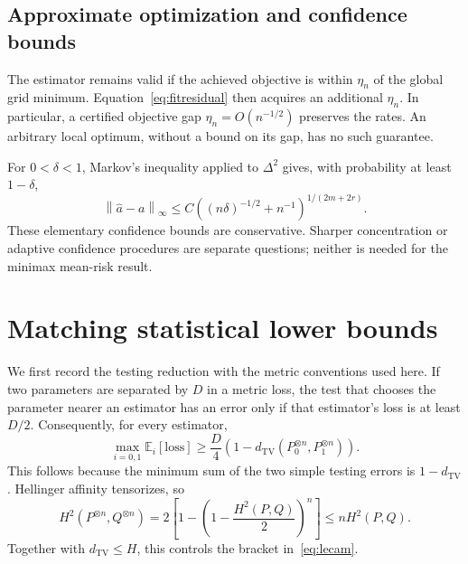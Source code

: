 \documentclass[11pt,a4paper]{article}
\numberwithin{equation}{section}
\theoremstyle{definition}
\theoremstyle{remark}
\newcommand{\E}{\mathbb E}
\newcommand{\TV}{d_{\mathrm{TV}}}
\newcommand{\norm}[1]{\left\lVert#1\right\rVert}
\begin{document}
\subsection{Approximate optimization and confidence bounds}
The estimator remains valid if the achieved objective is within $\eta_n$ of
the global grid minimum. Equation~\eqref{eq:fitresidual} then acquires an
additional $\eta_n$. In particular, a certified objective gap
$\eta_n=O(n^{-1/2})$ preserves the rates. An arbitrary local optimum, without
a bound on its gap, has no such guarantee.

For $0<\delta<1$, Markov's inequality applied to $\Delta^2$ gives, with
probability at least $1-\delta$,
\begin{equation}
 \norm{\widehat a-a}_\infty
 \le C\left((n\delta)^{-1/2}+n^{-1}\right)^{1/(2m+2r)}.
 \label{eq:confidence}
\end{equation}
These elementary confidence bounds are conservative. Sharper concentration
or adaptive confidence procedures are separate questions; neither is needed
for the minimax mean-risk result.

\section{Matching statistical lower bounds}
\label{sec:lower}

We first record the testing reduction with the metric conventions used here.
If two parameters are separated by $D$ in a metric loss, the test that chooses
the parameter nearer an estimator has an error only if that estimator's loss
is at least $D/2$. Consequently, for every estimator,
\begin{equation}
 \max_{i=0,1}\E_i[\mathrm{loss}]
 \ge\frac D4\left(1-\TV(P_0^{\otimes n},P_1^{\otimes n})\right).
 \label{eq:lecam}
\end{equation}
This follows because the minimum sum of the two simple testing errors is
$1-\TV$. Hellinger affinity tensorizes, so
\begin{equation}
 H^2(P^{\otimes n},Q^{\otimes n})
 =2\left[1-\left(1-\frac{H^2(P,Q)}2\right)^n\right]
 \le nH^2(P,Q).
 \label{eq:tensor}
\end{equation}
Together with $\TV\le H$, this controls the bracket in~\eqref{eq:lecam}.
\end{document}
